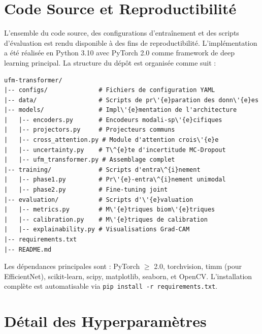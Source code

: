 \documentclass[12pt,a4paper]{report}
\begin{document}





\appendix

\chapter{Code Source et Reproductibilit\'{e}}
\label{ann:code}

L'ensemble du code source, des configurations d'entra\^{i}nement et des scripts d'\'{e}valuation est rendu disponible \`{a} des fins de reproductibilit\'{e}. L'impl\'{e}mentation a \'{e}t\'{e} r\'{e}alis\'{e}e en Python 3.10 avec PyTorch 2.0 comme framework de deep learning principal. La structure du d\'{e}p\^{o}t est organis\'{e}e comme suit :

\begin{verbatim}
ufm-transformer/
|-- configs/              # Fichiers de configuration YAML
|-- data/                 # Scripts de pr\'{e}paration des donn\'{e}es
|-- models/               # Impl\'{e}mentation de l'architecture
|   |-- encoders.py       # Encodeurs modali-sp\'{e}cifiques
|   |-- projectors.py     # Projecteurs communs
|   |-- cross_attention.py # Module d'attention crois\'{e}e
|   |-- uncertainty.py    # T\^{e}te d'incertitude MC-Dropout
|   |-- ufm_transformer.py # Assemblage complet
|-- training/             # Scripts d'entra\^{i}nement
|   |-- phase1.py         # Pr\'{e}-entra\^{i}nement unimodal
|   |-- phase2.py         # Fine-tuning joint
|-- evaluation/           # Scripts d'\'{e}valuation
|   |-- metrics.py        # M\'{e}triques biom\'{e}triques
|   |-- calibration.py    # M\'{e}triques de calibration
|   |-- explainability.py # Visualisations Grad-CAM
|-- requirements.txt
|-- README.md
\end{verbatim}

Les d\'{e}pendances principales sont : PyTorch $\geq$ 2.0, torchvision, timm (pour EfficientNet), scikit-learn, scipy, matplotlib, seaborn, et OpenCV. L'installation compl\`{e}te est automatisable via \texttt{pip install -r requirements.txt}.

\chapter{D\'{e}tail des Hyperparam\`{e}tres}
\label{ann:hyperparams}
\end{document}

